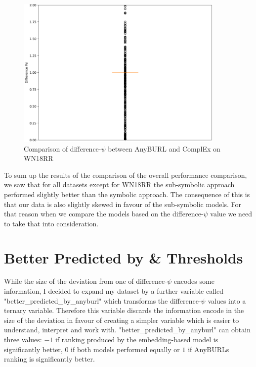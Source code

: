 \begin{figure}[H]
\centering
\includegraphics[width=0.9\textwidth]{images/difference_psi_anyburl_complex_wnrr.PNG}
\caption{Comparison of difference-$\psi$ between AnyBURL and ComplEx on WN18RR}
\label{fig:difference_psi_anyburl_complex_wnrr}
\end{figure}

To sum up the results of the comparison of the overall performance comparison, we saw that for all datasets except for WN18RR the sub-symbolic approach performed slightly better than the symbolic approach. The consequence of this is that our data is also slightly skewed in favour of the sub-symbolic models. For that reason when we compare the models based on the difference-$\psi$ value we need to take that into consideration.

\section{Better Predicted by \& Thresholds}
While the size of the deviation from one of difference-$\psi$ encodes some information, I decided to expand my dataset by a further variable called "better\_predicted\_by\_anyburl" which transforms the difference-$\psi$ values into a ternary variable. Therefore this variable discards the information encode in the size of the deviation in favour of creating a simpler variable which is easier to understand, interpret and work with. "better\_predicted\_by\_anyburl" can obtain three values: $-1$ if ranking produced by the embedding-based model is significantly better, $0$ if both models performed equally or $1$ if AnyBURLs ranking is significantly better. 

